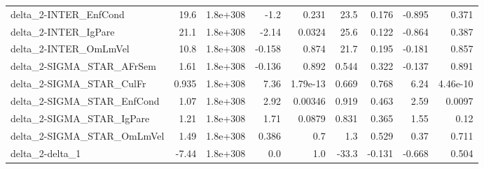 \begin{tabular}{lrrrrrrrr}
delta\_2-INTER\_EnfCond                 &        19.6 &     1.8e+308 &    -1.2 &    0.231 &       23.5 &       0.176 &       -0.895 &         0.371 \\
delta\_2-INTER\_IgPare                  &        21.1 &     1.8e+308 &   -2.14 &   0.0324 &       25.6 &       0.122 &       -0.864 &         0.387 \\
delta\_2-INTER\_OmLmVel                 &        10.8 &     1.8e+308 &  -0.158 &    0.874 &       21.7 &       0.195 &       -0.181 &         0.857 \\
delta\_2-SIGMA\_STAR\_AFrSem             &        1.61 &     1.8e+308 &  -0.136 &    0.892 &      0.544 &       0.322 &       -0.137 &         0.891 \\
delta\_2-SIGMA\_STAR\_CulFr              &       0.935 &     1.8e+308 &    7.36 & 1.79e-13 &      0.669 &       0.768 &         6.24 &      4.46e-10 \\
delta\_2-SIGMA\_STAR\_EnfCond            &        1.07 &     1.8e+308 &    2.92 &  0.00346 &      0.919 &       0.463 &         2.59 &        0.0097 \\
delta\_2-SIGMA\_STAR\_IgPare             &        1.21 &     1.8e+308 &    1.71 &   0.0879 &      0.831 &       0.365 &         1.55 &          0.12 \\
delta\_2-SIGMA\_STAR\_OmLmVel            &        1.49 &     1.8e+308 &   0.386 &      0.7 &        1.3 &       0.529 &         0.37 &         0.711 \\
delta\_2-delta\_1                       &       -7.44 &     1.8e+308 &     0.0 &      1.0 &      -33.3 &      -0.131 &       -0.668 &         0.504 \\
\bottomrule
\end{tabular}
